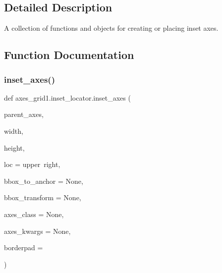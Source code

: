 \subsection{Detailed Description}
\begin{DoxyVerb}A collection of functions and objects for creating or placing inset axes.
\end{DoxyVerb}
 

\subsection{Function Documentation}
\mbox{\label{namespaceaxes__grid1_1_1inset__locator_ace6e193a4a68fc92ef9c7af974fe0eb8}} 
\subsubsection{\texorpdfstring{inset\+\_\+axes()}{inset\_axes()}}
{\footnotesize\ttfamily def axes\+\_\+grid1.\+inset\+\_\+locator.\+inset\+\_\+axes (\begin{DoxyParamCaption}\item[{}]{parent\+\_\+axes,  }\item[{}]{width,  }\item[{}]{height,  }\item[{}]{loc = {\ttfamily \textquotesingle{}upper~right\textquotesingle{}},  }\item[{}]{bbox\+\_\+to\+\_\+anchor = {\ttfamily None},  }\item[{}]{bbox\+\_\+transform = {\ttfamily None},  }\item[{}]{axes\+\_\+class = {\ttfamily None},  }\item[{}]{axes\+\_\+kwargs = {\ttfamily None},  }\item[{}]{borderpad = {} }\end{DoxyParamCaption})}

